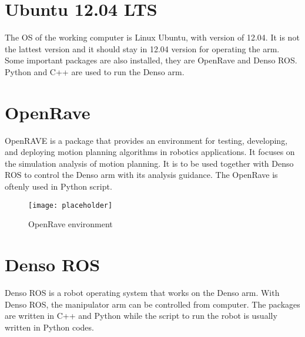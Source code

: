 \section{Ubuntu 12.04 LTS}
The OS of the working computer is Linux Ubuntu, with version of 12.04. It is not the lattest version and it should stay in 12.04 version for operating the arm. Some important packages are also installed, they are OpenRave and Denso ROS. Python and C++ are used to run the Denso arm.

\section{OpenRave}
OpenRAVE is a package that provides an environment for testing, developing, and deploying motion planning algorithms in robotics applications. It focuses on the simulation analysis of motion planning. It is to be used together with Denso ROS to control the Denso arm with its analysis guidance. The OpenRave is oftenly used in Python script.
\begin{figure}[h]
    \centering
    \texttt{[image: placeholder]}
    \caption{OpenRave environment}
    \label{fig:OpenRave}
\end{figure}
  
\section{Denso ROS}
Denso ROS is a robot operating system that works on the Denso arm. With Denso ROS, the manipulator arm can be controlled from computer. The packages are written in C++ and Python while the script to run the robot is usually written in Python codes.
